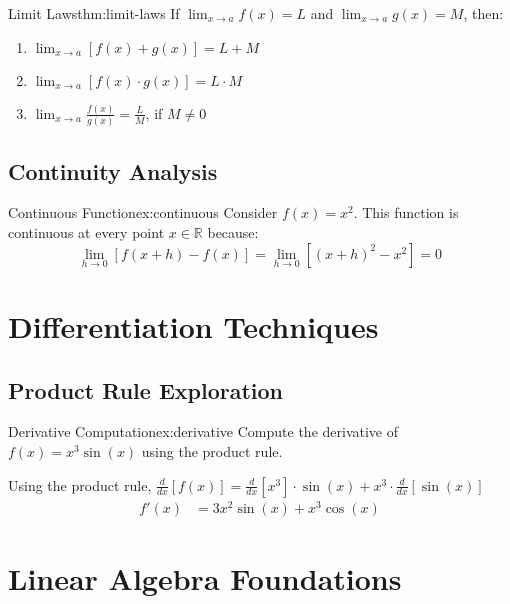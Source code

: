 \documentclass[12pt,a4paper]{article}
\begin{document}
\begin{Theorem}{Limit Laws}{thm:limit-laws}
    If $\lim_{x \to a} f(x) = L$ and $\lim_{x \to a} g(x) = M$, then:
    \begin{enumerate}
        \item $\lim_{x \to a} [f(x) + g(x)] = L + M$
        \item $\lim_{x \to a} [f(x) \cdot g(x)] = L \cdot M$
        \item $\lim_{x \to a} \frac{f(x)}{g(x)} = \frac{L}{M}$, if $M \neq 0$
    \end{enumerate}
\end{Theorem}

\subsection{Continuity Analysis}
\begin{Example}{Continuous Function}{ex:continuous}
    Consider $f(x) = x^2$. This function is continuous at every point $x \in \mathbb{R}$ because:
    \[\lim_{h \to 0} [f(x+h) - f(x)] = \lim_{h \to 0} [(x+h)^2 - x^2] = 0\]
\end{Example}

\section{Differentiation Techniques}

\subsection{Product Rule Exploration}
\begin{Exercise}{Derivative Computation}{ex:derivative}
    Compute the derivative of $f(x) = x^3 \sin(x)$ using the product rule.
\end{Exercise}

\begin{solution}
    Using the product rule, $\frac{d}{dx}[f(x)] = \frac{d}{dx}[x^3] \cdot \sin(x) + x^3 \cdot \frac{d}{dx}[\sin(x)]$
    \begin{align*}
        f'(x) &= 3x^2 \sin(x) + x^3 \cos(x)
    \end{align*}
\end{solution}

\section{Linear Algebra Foundations}
\end{document}
